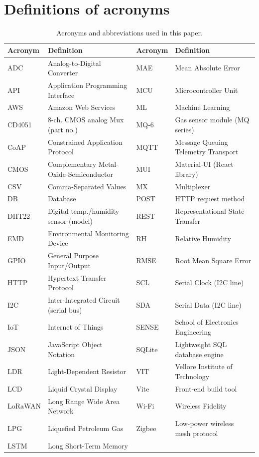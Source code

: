 \documentclass[journal,onecolumn]{IEEEtran}
\begin{document}
\section*{Definitions of acronyms}
\begin{table}[h]
\centering
\caption{Acronyms and abbreviations used in this paper.}
\label{tab:acronyms}
\small
\begin{tabular}{@{}ll@{\hspace{1.5em}}ll@{}}
\hline
\textbf{Acronym} & \textbf{Definition} & \textbf{Acronym} & \textbf{Definition} \\
\hline
ADC & Analog-to-Digital Converter & MAE & Mean Absolute Error \\
API & Application Programming Interface & MCU & Microcontroller Unit \\
AWS & Amazon Web Services & ML & Machine Learning \\
CD4051 & 8-ch. CMOS analog Mux (part no.) & MQ-6 & Gas sensor module (MQ series) \\
CoAP & Constrained Application Protocol & MQTT & Message Queuing Telemetry Transport \\
CMOS & Complementary Metal-Oxide-Semiconductor & MUI & Material-UI (React library) \\
CSV & Comma-Separated Values & MX & Multiplexer \\
DB & Database & POST & HTTP request method \\
DHT22 & Digital temp./humidity sensor (model) & REST & Representational State Transfer \\
EMD & Environmental Monitoring Device & RH & Relative Humidity \\
GPIO & General Purpose Input/Output & RMSE & Root Mean Square Error \\
HTTP & Hypertext Transfer Protocol & SCL & Serial Clock (I2C line) \\
I2C & Inter-Integrated Circuit (serial bus) & SDA & Serial Data (I2C line) \\
IoT & Internet of Things & SENSE & School of Electronics Engineering \\
JSON & JavaScript Object Notation & SQLite & Lightweight SQL database engine \\
LDR & Light-Dependent Resistor & VIT & Vellore Institute of Technology \\
LCD & Liquid Crystal Display & Vite & Front-end build tool \\
LoRaWAN & Long Range Wide Area Network & Wi-Fi & Wireless Fidelity \\
LPG & Liquefied Petroleum Gas & Zigbee & Low-power wireless mesh protocol \\
LSTM & Long Short-Term Memory & & \\
\hline
\end{tabular}
\end{table}
\end{document}

